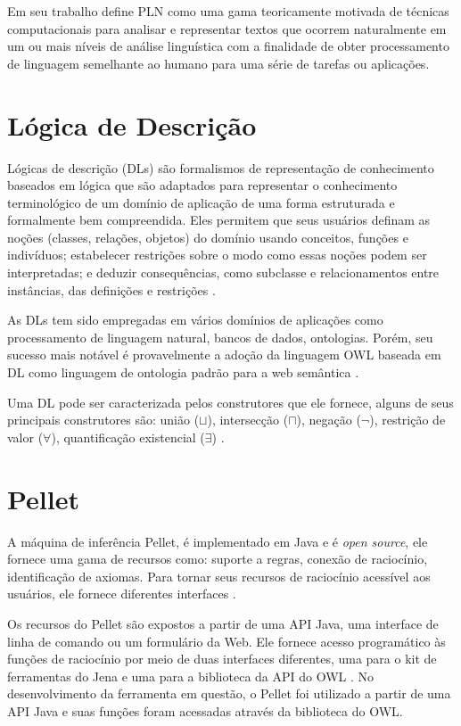 \documentclass{bcc}
\begin{document}
Em seu trabalho \cite{liddy2001} define PLN como uma gama teoricamente motivada de técnicas computacionais para analisar e representar textos que ocorrem naturalmente em um ou mais níveis de análise linguística com a finalidade de obter processamento de linguagem semelhante ao humano para uma série de tarefas ou aplicações.

\section{Lógica de Descrição}

Lógicas de descrição (DLs) são formalismos de representação de conhecimento baseados em lógica que são adaptados para representar o conhecimento terminológico de um domínio de aplicação de uma forma estruturada e formalmente bem compreendida. Eles permitem que seus usuários definam as noções (classes, relações, objetos) do domínio usando conceitos, funções e indivíduos; estabelecer restrições sobre o modo como essas noções podem ser interpretadas; e deduzir consequências, como subclasse e relacionamentos entre instâncias, das definições e restrições \cite{baader2001}.

As DLs tem sido empregadas em vários domínios de aplicações como processamento de linguagem natural, bancos de dados, ontologias. Porém, seu sucesso mais notável é provavelmente a adoção da linguagem OWL baseada em DL como linguagem de ontologia padrão para a web semântica \cite{baader2002}.

Uma DL pode ser caracterizada pelos construtores que ele fornece, alguns de seus principais construtores são: união ($\sqcup$), intersecção ($\sqcap$), negação ($\neg$), restrição de valor ($\forall$), quantificação existencial ($\exists$) \cite{kepler2006}.

\section{Pellet}

A máquina de inferência Pellet, é implementado em Java e é \textit{open source}, ele fornece uma gama de recursos como: suporte a regras, conexão de raciocínio, identificação de axiomas. Para tornar seus recursos de raciocínio acessível aos usuários, ele fornece diferentes interfaces \cite{sirin2007}. 

Os recursos do Pellet são expostos a partir de uma API Java, uma interface de linha de comando ou um formulário da Web. Ele fornece acesso programático às funções de raciocínio por meio de duas interfaces diferentes, uma para o kit de ferramentas do Jena e uma para a biblioteca da API do OWL \cite{parsia2004}. No desenvolvimento da ferramenta em questão, o Pellet foi utilizado a partir de uma API Java e suas funções foram acessadas através da biblioteca do OWL. 
\end{document}
